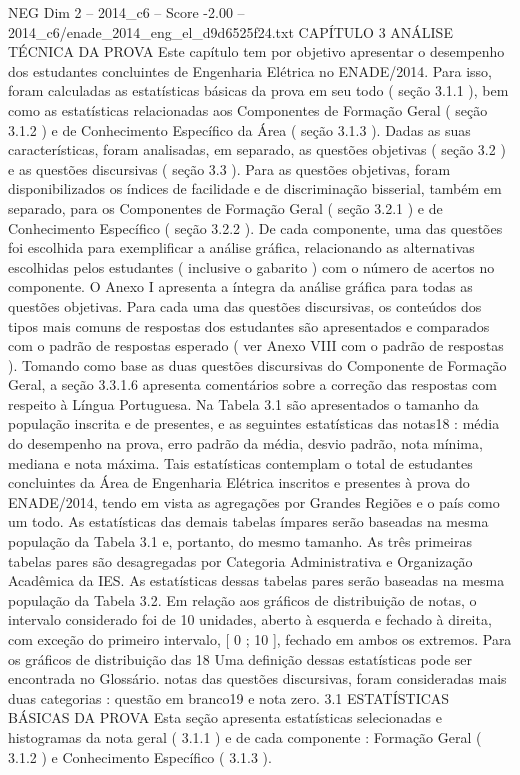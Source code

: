 \begin{textsample}{NEG Dim 2 – 2014\_c6 – Score -2.00 – 2014\_c6/enade\_2014\_eng\_el\_d9d6525f24.txt}  \label{ex:f2_neg_206}
CAPÍTULO 3 ANÁLISE TÉCNICA DA PROVA Este capítulo tem por objetivo apresentar o desempenho dos estudantes concluintes de Engenharia Elétrica no ENADE/2014.
Para isso, foram calculadas as estatísticas básicas da prova em seu todo ( seção 3.1.1 ), bem como as estatísticas relacionadas aos Componentes de Formação Geral ( seção 3.1.2 ) e de Conhecimento Específico da Área ( seção 3.1.3 ).
Dadas as suas características, foram analisadas, em separado, as questões objetivas ( seção 3.2 ) e as questões discursivas ( seção 3.3 ).
Para as questões objetivas, foram disponibilizados os índices de facilidade e de discriminação bisserial, também em separado, para os Componentes de Formação Geral ( seção 3.2.1 ) e de Conhecimento Específico ( seção 3.2.2 ).
De cada componente, uma das questões foi escolhida para exemplificar a análise gráfica, relacionando as alternativas escolhidas pelos estudantes ( inclusive o gabarito ) com o número de acertos no componente.
O Anexo I apresenta a íntegra da análise gráfica para todas as questões objetivas.
Para cada uma das questões discursivas, os conteúdos dos tipos mais comuns de respostas dos estudantes são apresentados e comparados com o padrão de respostas esperado ( ver Anexo VIII com o padrão de respostas ).
Tomando como base as duas questões discursivas do Componente de Formação Geral, a seção 3.3.1.6 apresenta comentários sobre a correção das respostas com respeito à Língua Portuguesa.
Na Tabela 3.1 são apresentados o tamanho da população inscrita e de presentes, e as seguintes estatísticas das notas18 : média do desempenho na prova, erro padrão da média, desvio padrão, nota mínima, mediana e nota máxima.
Tais estatísticas contemplam o total de estudantes concluintes da Área de Engenharia Elétrica inscritos e presentes à prova do ENADE/2014, tendo em vista as agregações por Grandes Regiões e o país como um todo.
As estatísticas das demais tabelas ímpares serão baseadas na mesma população da Tabela 3.1 e, portanto, do mesmo tamanho.
As três primeiras tabelas pares são desagregadas por Categoria Administrativa e Organização Acadêmica da IES.
As estatísticas dessas tabelas pares serão baseadas na mesma população da Tabela 3.2.
Em relação aos gráficos de distribuição de notas, o intervalo considerado foi de 10 unidades, aberto à esquerda e fechado à direita, com exceção do primeiro intervalo, [ 0 ; 10 ], fechado em ambos os extremos.
Para os gráficos de distribuição das 18 Uma definição dessas estatísticas pode ser encontrada no Glossário. notas das questões discursivas, foram consideradas mais duas categorias : questão em branco19 e nota zero. 3.1 ESTATÍSTICAS BÁSICAS DA PROVA Esta seção apresenta estatísticas selecionadas e histogramas da nota geral ( 3.1.1 ) e de cada componente : Formação Geral ( 3.1.2 ) e Conhecimento Específico ( 3.1.3 ).

\end{textsample}
